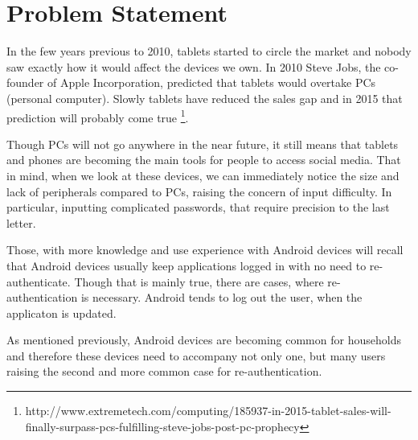 
\chapter{Problem Statement} %


In the few years previous to 2010, tablets started to circle the market and nobody saw exactly how it would affect the devices we own. In 2010 Steve Jobs, the co-founder of Apple Incorporation, predicted that tablets would overtake PCs (personal computer). Slowly tablets have reduced the sales gap and in 2015 that prediction will probably come true \footnote[5]{http://www.extremetech.com/computing/185937-in-2015-tablet-sales-will-finally-surpass-pcs-fulfilling-steve-jobs-post-pc-prophecy}.

Though PCs will not go anywhere in the near future, it still means that tablets and phones are becoming the main tools for people to access social media. That in mind, when we look at these devices, we can immediately notice the size and lack of peripherals compared to PCs, raising the concern of input difficulty. In particular, inputting complicated passwords, that require precision to the last letter. 

Those, with  more knowledge and use experience with Android devices will recall that Android devices usually keep applications logged in with no need to re-authenticate. Though that is mainly true, there are cases, where re-authentication is necessary. Android tends to log out the user, when the applicaton is updated. 

As mentioned previously, Android devices are becoming common for households and therefore these devices need to accompany not only one, but many users raising the second and more common case for re-authentication. 




\ifpdf
    \graphicspath{{X/figures/PNG/}{X/figures/PDF/}{X/figures/}}
\else
    \graphicspath{{X/figures/EPS/}{X/figures/}}
\fi


